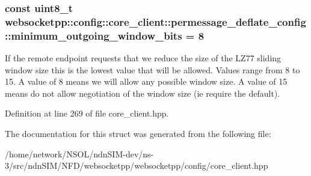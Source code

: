 \subsubsection[{\texorpdfstring{minimum\+\_\+outgoing\+\_\+window\+\_\+bits}{minimum\_outgoing\_window\_bits}}]{\setlength{\rightskip}{0pt plus 5cm}const uint8\+\_\+t websocketpp\+::config\+::core\+\_\+client\+::permessage\+\_\+deflate\+\_\+config\+::minimum\+\_\+outgoing\+\_\+window\+\_\+bits = 8\hspace{0.3cm}{\ttfamily [static]}}\hypertarget{structwebsocketpp_1_1config_1_1core__client_1_1permessage__deflate__config_a0ac8d0ba3a5fcc0220cd282b2e18242c}{}\label{structwebsocketpp_1_1config_1_1core__client_1_1permessage__deflate__config_a0ac8d0ba3a5fcc0220cd282b2e18242c}
If the remote endpoint requests that we reduce the size of the L\+Z77 sliding window size this is the lowest value that will be allowed. Values range from 8 to 15. A value of 8 means we will allow any possible window size. A value of 15 means do not allow negotiation of the window size (ie require the default). 

Definition at line 269 of file core\+\_\+client.\+hpp.



The documentation for this struct was generated from the following file\+:\begin{DoxyCompactItemize}
\item 
/home/network/\+N\+S\+O\+L/ndn\+S\+I\+M-\/dev/ns-\/3/src/ndn\+S\+I\+M/\+N\+F\+D/websocketpp/websocketpp/config/core\+\_\+client.\+hpp\end{DoxyCompactItemize}
